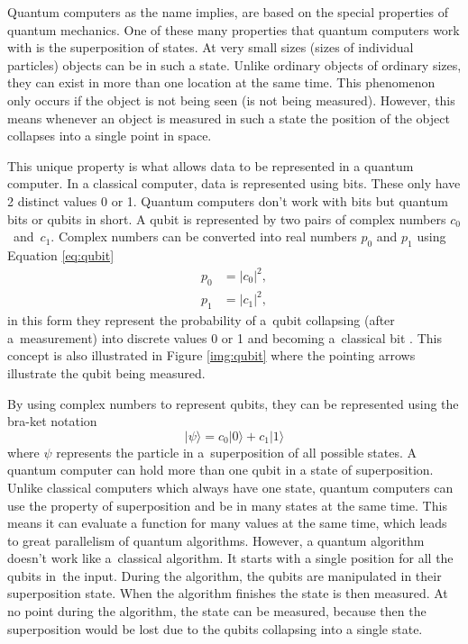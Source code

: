 Quantum computers as the name implies, are based on the special properties of quantum mechanics. One of these many properties that quantum computers work with is the superposition of states. At very small sizes (sizes of individual particles) objects can be in such a state. Unlike ordinary objects of ordinary sizes, they can exist in more than one location at the same time. This phenomenon only occurs if the object is not being seen (is not being measured). However, this means whenever an object is measured in such a state the position of the object collapses into a single point in space. \cite{Yanofsky2008}


This unique property is what allows data to be represented in a quantum computer. In a classical computer, data is represented using bits. These only have 2 distinct values 0 or 1. Quantum computers don't work with bits but quantum bits or qubits in short. A qubit is represented by two pairs of complex numbers $c_0$~and~$c_1$. Complex numbers can be converted into real numbers $p_0$ and $p_1$ using Equation \ref{eq:qubit}
\begin{equation}
  \label{eq:qubit}
  \begin{aligned}
    p_0 & = \lvert c_0 \rvert^2, \\
    p_1 & = \lvert c_1 \rvert^2,
  \end{aligned}
\end{equation}
in this form they represent the probability of a~qubit collapsing (after a~measurement) into discrete values 0 or 1 and becoming a~classical bit \cite{Yanofsky2008}. This concept is also illustrated in Figure \ref{img:qubit} where the pointing arrows illustrate the qubit being measured.

By using complex numbers to represent qubits, they can be represented using the bra-ket notation
\begin{equation}
  \lvert\psi\rangle=c_0|0\rangle + c_1|1\rangle
\end{equation}
where $\psi$ represents the particle in a~superposition of all possible states. A quantum computer can hold more than one qubit in a state of superposition. Unlike classical computers which always have one state, quantum computers can use the property of superposition and be in many states at the same time. This means it can evaluate a function for many values at the same time, which leads to great parallelism of quantum algorithms. However, a quantum algorithm doesn't work like a~classical algorithm. It starts with a single position for all the qubits in~the input. During the algorithm, the qubits are manipulated in their superposition state. When the algorithm finishes the state is then measured. At no point during the algorithm, the state can be measured, because then the superposition would be lost due to the qubits collapsing into a single state. \cite{Yanofsky2008}
